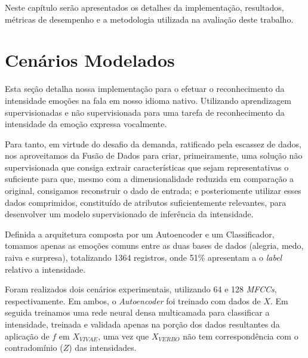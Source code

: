 
Neste capítulo serão apresentados os detalhes da implementação, resultados, métricas de desempenho e a metodologia utilizada na avaliação deste trabalho.\\

\section{Cenários Modelados}\label{sec:implementacao}

Esta seção detalha nossa implementação para o efetuar o reconhecimento da intensidade emoções na fala em nosso idioma nativo. Utilizando aprendizagem supervisionadas e não supervisionada para uma tarefa de reconhecimento da intensidade da emoção expressa vocalmente.

Para tanto, em virtude do desafio da demanda, ratificado pela escassez de dados, nos aproveitamos da Fusão de Dados para criar, primeiramente, uma solução não supervisionada que consiga extrair características que sejam representativas o suficiente para que, mesmo com a dimensionalidade reduzida em comparação a original, consigamos reconstruir o dado de entrada; e posteriomente utilizar esses dados comprimidos, constituído de atributos suficientemente relevantes, para desenvolver um modelo supervisionado de inferência da intensidade.

Definida a arquitetura composta por um Autoencoder e um Classificador, tomamos apenas as emoções comuns entre as duas bases de dados (alegria, medo, raiva e surpresa), totalizando 1364 registros, onde 51\% apresentam a o \textit{label} relativo a intensidade. %


Foram realizados dois cenários experimentais, utilizando 64 e 128 \textit{MFCCs}, respectivamente. Em ambos, o \textit{Autoencoder} foi treinado com dados de $X$. Em seguida treinamos uma rede neural densa multicamada para classificar a intensidade, treinada e validada apenas na porção dos dados resultantes da aplicação de $f$ em $X_{VIVAE}$, uma vez que $X_{VERBO}$ não tem correspondência com o contradomínio ($Z$) das intensidades.

